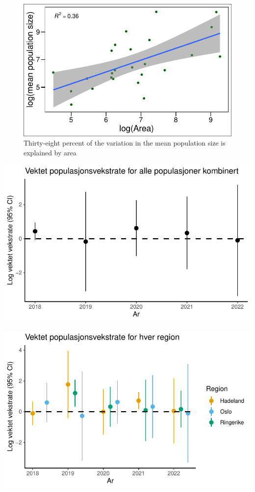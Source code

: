 \documentclass[
  letterpaper,
  DIV=11,
  numbers=noendperiod]{scrreport}
\begin{document}
\begin{figure}

{\centering \includegraphics{growthRate_meta_files/figure-pdf/unnamed-chunk-1-1.pdf}

}

\caption{Thirty-eight percent of the variation in the mean population
size is explained by area}

\end{figure}

\includegraphics{growthRate_meta_files/figure-pdf/unnamed-chunk-4-1.pdf}

\includegraphics{growthRate_meta_files/figure-pdf/unnamed-chunk-5-1.pdf}
\end{document}
